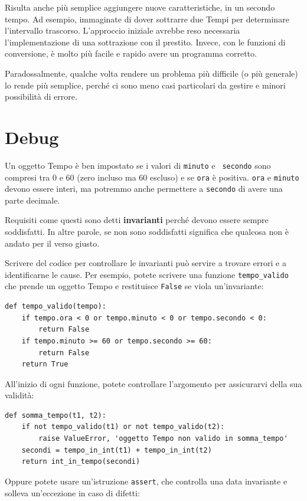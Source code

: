 \documentclass[10pt]{book}
\begin{document}
Risulta anche più semplice aggiungere nuove caratteristiche, in un secondo tempo. Ad esempio, immaginate di dover sottrarre due Tempi per determinare l'intervallo trascorso. L'approccio iniziale avrebbe reso necessaria l'implementazione di una sottrazione con il prestito. Invece, con le funzioni di conversione, è molto più facile e rapido avere un programma corretto.

Paradossalmente, qualche volta rendere un problema più difficile (o più generale) lo rende più semplice, perché ci sono meno casi particolari da gestire e minori possibilità di errore.


\section{Debug}

Un oggetto Tempo è ben impostato se i valori di {\tt minuto} e {\tt
secondo} sono compresi tra 0 e 60 (zero incluso ma 60 escluso) e se 
{\tt ora} è positiva.  {\tt ora} e {\tt minuto} devono essere interi, ma potremmo anche permettere a {\tt secondo} di avere una parte decimale.

Requisiti come questi sono detti {\bf invarianti} perché devono essere sempre soddisfatti. In altre parole, se non sono soddisfatti significa che qualcosa non è andato per il verso giusto.

Scrivere del codice per controllare le invarianti può servire a trovare errori e a identificarne le cause. Per esempio, potete scrivere una funzione
 \verb"tempo_valido" che prende un oggetto Tempo e restituisce
{\tt False} se viola un'invariante:

\begin{verbatim}
def tempo_valido(tempo):
    if tempo.ora < 0 or tempo.minuto < 0 or tempo.secondo < 0:
        return False
    if tempo.minuto >= 60 or tempo.secondo >= 60:
        return False
    return True
\end{verbatim}
%
All'inizio di ogni funzione, potete controllare l'argomento per assicurarvi della sua validità:

\begin{verbatim}
def somma_tempo(t1, t2):
    if not tempo_valido(t1) or not tempo_valido(t2):
        raise ValueError, 'oggetto Tempo non valido in somma_tempo'
    secondi = tempo_in_int(t1) + tempo_in_int(t2)
    return int_in_tempo(secondi)
\end{verbatim}
%
Oppure potete usare un'istruzione {\tt assert}, che controlla una data invariante e solleva un'eccezione in caso di difetti:
\end{document}
